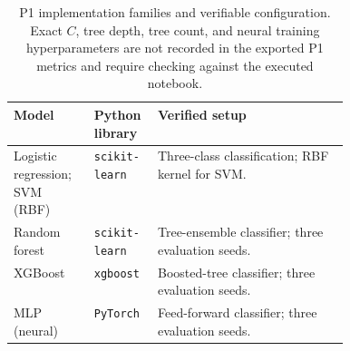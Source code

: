\begin{table}[!htbp]\centering\footnotesize
\caption{P1 implementation families and verifiable configuration. Exact $C$, tree depth, tree count, and neural training hyperparameters are not recorded in the exported P1 metrics and require checking against the executed notebook.}\label{tab:p1impl}
\begin{tabularx}{\linewidth}{@{}p{0.24\linewidth}p{0.19\linewidth}X@{}}\toprule
\textbf{Model} & \textbf{Python library} & \textbf{Verified setup}\\\midrule
Logistic regression; SVM (RBF) & \texttt{scikit-learn} & Three-class classification; RBF kernel for SVM.\\
Random forest & \texttt{scikit-learn} & Tree-ensemble classifier; three evaluation seeds.\\
XGBoost & \texttt{xgboost} & Boosted-tree classifier; three evaluation seeds.\\
MLP (neural) & \texttt{PyTorch} & Feed-forward classifier; three evaluation seeds.\\
\bottomrule\end{tabularx}
\end{table}

